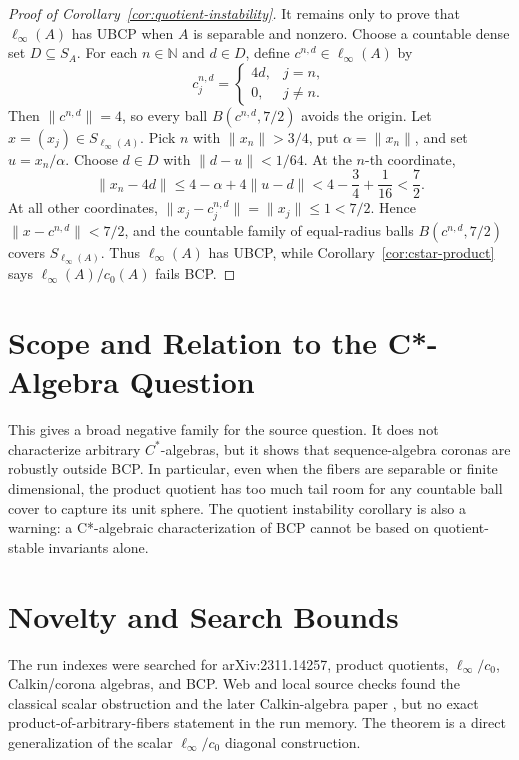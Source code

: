 \documentclass[11pt]{article}
\begin{document}
\begin{proof}[Proof of Corollary~\ref{cor:quotient-instability}]
It remains only to prove that \(\ell_\infty(A)\) has UBCP when \(A\) is
separable and nonzero.  Choose a countable dense set \(D\subseteq S_A\).  For
each \(n\in\mathbb N\) and \(d\in D\), define \(c^{n,d}\in \ell_\infty(A)\) by
\[
        c^{n,d}_j=
        \begin{cases}
        4d,& j=n,\\
        0,& j\ne n.
        \end{cases}
\]
Then \(\|c^{n,d}\|=4\), so every ball \(B(c^{n,d},7/2)\) avoids the origin.
Let \(x=(x_j)\in S_{\ell_\infty(A)}\).  Pick \(n\) with
\(\|x_n\|>3/4\), put \(\alpha=\|x_n\|\), and set \(u=x_n/\alpha\).  Choose
\(d\in D\) with \(\|d-u\|<1/64\).  At the \(n\)-th coordinate,
\[
        \|x_n-4d\|
        \le 4-\alpha+4\|u-d\|
        < 4-\frac34+\frac1{16}
        < \frac72.
\]
At all other coordinates, \(\|x_j-c^{n,d}_j\|=\|x_j\|\le1<7/2\).  Hence
\(\|x-c^{n,d}\|<7/2\), and the countable family of equal-radius balls
\(B(c^{n,d},7/2)\) covers \(S_{\ell_\infty(A)}\).  Thus \(\ell_\infty(A)\)
has UBCP, while Corollary~\ref{cor:cstar-product} says
\(\ell_\infty(A)/c_0(A)\) fails BCP.
\end{proof}

\section*{Scope and Relation to the C*-Algebra Question}

This gives a broad negative family for the source question.  It does not
characterize arbitrary \(C^*\)-algebras, but it shows that sequence-algebra
coronas are robustly outside BCP.  In particular, even when the fibers are
separable or finite dimensional, the product quotient has too much tail room
for any countable ball cover to capture its unit sphere.  The quotient
instability corollary is also a warning: a C*-algebraic characterization of
BCP cannot be based on quotient-stable invariants alone.

\section*{Novelty and Search Bounds}

The run indexes were searched for arXiv:2311.14257, product quotients,
\(\ell_\infty/c_0\), Calkin/corona algebras, and BCP.  Web and local source
checks found the classical scalar obstruction and the later Calkin-algebra
paper \cite{BLS}, but no exact product-of-arbitrary-fibers statement in the
run memory.  The theorem is a direct generalization of the scalar
\(\ell_\infty/c_0\) diagonal construction.
\end{document}
